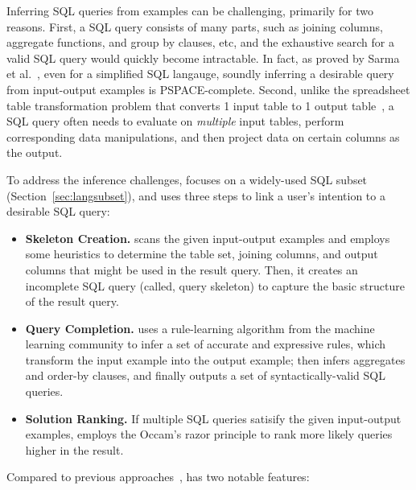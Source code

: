 Inferring SQL queries from examples can be challenging,
primarily for two reasons. First, a SQL query consists
of many parts, such as joining columns, aggregate functions,
and group by clauses, etc, and the exhaustive search for a valid SQL
query would quickly become intractable. In fact, as proved
by Sarma et al.~\cite{DasSarma:2010}, even for a simplified
SQL langauge, soundly inferring a desirable query from input-output
examples is PSPACE-complete. Second, unlike the spreadsheet
table transformation problem that converts 1 input
table to 1 output table~\cite{Harris:2011}, a SQL query often
needs to evaluate on \textit{multiple} input tables, perform
corresponding data manipulations, and then project data on
certain columns as the output.


To address the inference challenges,
\ourtool focuses on a widely-used SQL subset (Section~\ref{sec:langsubset}),
and uses three steps to link a user's intention to
a desirable SQL query:



\begin{itemize}
\item \textbf{Skeleton Creation.} \ourtool scans the
given input-output examples and employs some heuristics
to determine the table set, joining columns, and output columns that might
be used in the result query. Then, it creates an
incomplete SQL query (called, query skeleton) to
capture the basic structure of the result query.

\item \textbf{Query Completion.} \ourtool
uses a rule-learning algorithm from the machine
learning community to infer a set of accurate
and expressive rules, which transform the input
example into the output example; then infers
aggregates and order-by clauses, and finally
outputs a set of syntactically-valid SQL
queries. 


\item \textbf{Solution Ranking.} If multiple SQL
queries satisify the given input-output examples,
\ourtool employs the Occam's razor principle to
rank more likely queries higher in the result.
\end{itemize}

Compared to previous approaches~\cite{Zloof:1975,
Tran:2009, DasSarma:2010, abs-1208-2013}, \ourtool has two notable features:

